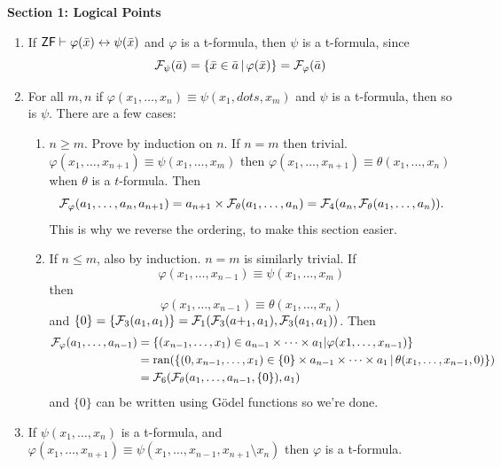 \documentclass{article}
\begin{document}
\textbf{Section 1: Logical Points} \begin{enumerate}
    \item[(a)] If $\mathsf{ZF} \vdash \varphi(\bar{x}) \leftrightarrow \psi(\bar{x})$ and $\varphi$ is a t-formula, then $\psi$ is a t-formula, since \[ \mathcal{F}_{\psi}(\bar{a}) = \{ \bar{x} \in \bar{a} \, | \, \varphi(\bar{x})\} = \mathcal{F}_{\varphi}(\bar{a})\]
    \item[(b)] For all $m,n$ if $\varphi(x_{1},\dots, x_{n}) \equiv \psi(x_{1},dots,x_{m})$ and $\psi$ is a t-formula, then so is $\psi$. There are a few cases: \begin{enumerate}
              \item[(i)] $n \geq m$. Prove by induction on $n$. If $n=m$ then trivial. $\varphi(x_{1},\dots,x_{n+1}) \equiv \psi(x_{1},\dots,x_{m})$ then $\varphi(x_{1},\dots, x_{n+1}) \equiv \theta(x_{1},\dots,x_{n})$ when $\theta$ is a $t$-formula. Then \[ \mathcal{F}_{\varphi}(a_{1},\dots, a_{n},a_{n+1}) = a_{n+1} \times \mathcal{F}_{\theta}(a_{1},\dots, a_{n}) = \mathcal{F}_{4}(a_{n},\mathcal{F}_{\theta}(a_{1},\dots,a_{n})).\] This is why we reverse the ordering, to make this section easier.
              \item[(ii)] If $n \leq m$, also by induction. $n=m$ is similarly trivial. If \[\varphi(x_{1},\dots,x_{n-1}) \equiv \psi(x_{1},\dots,x_{m})\] then \[ \varphi(x_{1},\dots, x_{n-1}) \equiv \theta(x_{1},\dots, x_{n})\] and $\{0\} = \{\mathcal{F}_{3}(a_{1},a_{1})\} = \mathcal{F}_{1}(\mathcal{F}_{3}(a+_{1},a_{1}),\mathcal{F}_{3}(a_{1},a_{1}))$. Then \begin{align*}
                        \mathcal{F}_{\varphi}(a_{1},\dots,a_{n-1}) & = \{ (x_{n-1}, \dots, x_{1}) \in a_{n-1} \times \dots \times a_{1} | \varphi(x {1},\dots, x_{n-1})\}                              \\
                                                             & = \operatorname{ran}( \{(0,x_{n-1},\dots,x_{1})   \in \{0\} \times a_{n-1} \times \dots \times a_{1} \, | \, \theta(x_{1},\dots,x_{n-1},0) \} ) \\
                                                             & = \mathcal{F}_{6}(\mathcal{F}_{\theta}(a_{1},\dots, a_{n-1}, \{0\}), a_{1})
                    \end{align*}
                    and $\{0\}$ can be written using G\"odel functions so we're done.
          \end{enumerate}
    \item[(c)] If $\psi(x_{1},\dots,x_{n})$ is a t-formula, and $\varphi(x_{1},\dots,x_{n+1}) \equiv \psi(x_{1},\dots, x_{n-1}, x_{n+1}\setminus x_{n})$ then $\varphi$ is a t-formula. \gap

\end{enumerate}
\end{document}
